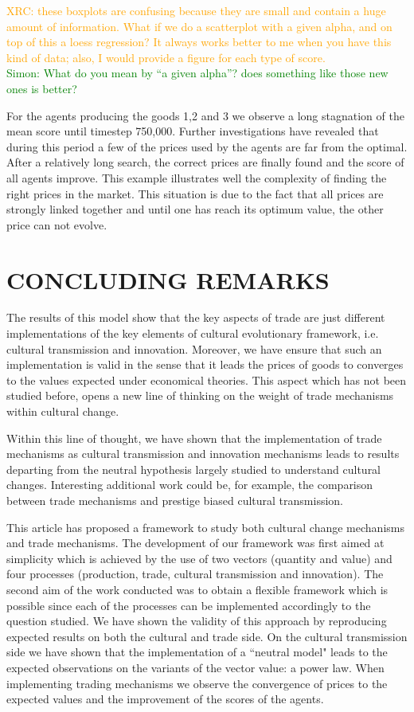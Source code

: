 \documentclass{wscpaperproc}
\newcommand{\memo}[2]{\textcolor{#1}{#2}}
\newcommand{\simon}[1]{\memo{green}{Simon: #1\\}}
\newcommand{\xrc}[1]{\memo{orange}{XRC: #1\\}}
\begin{document}
\xrc{these boxplots are confusing because they are small and contain a huge amount of information. What if we do a scatterplot with a given alpha, and on top of this a loess regression? It always works better to me when you have this kind of data; also, I would provide a figure for each type of score.}
\simon{What do you mean by ``a given alpha''? does something like those new ones is better?}

For the agents producing the goods 1,2 and 3 we observe a long stagnation of the mean score until timestep 750,000. Further investigations have revealed that during this period a few of the prices used by the agents are far from the optimal. After a relatively long search, the correct prices are finally found and the score of all agents improve. This example illustrates well the complexity of finding the right prices in the market. This situation is due to the fact that all prices are strongly linked together and until one has reach its optimum value, the other price can not evolve. 


\section{CONCLUDING REMARKS}

The results of this model show that the key aspects of trade are just different implementations of the key elements of cultural evolutionary framework, i.e. cultural transmission and innovation. Moreover, we have ensure that such an implementation is valid in the sense that it leads the prices of goods to converges to the values expected under economical theories. This aspect which has not been studied before, opens a new line of thinking on the weight of trade mechanisms within cultural change.

Within this line of thought, we have shown that the implementation of trade mechanisms as cultural transmission and innovation mechanisms leads to results departing from the neutral hypothesis largely studied to understand cultural changes. Interesting additional work could be, for example, the comparison between trade mechanisms and prestige biased cultural transmission.

This article has proposed a framework to study both cultural change mechanisms and trade mechanisms. The development of our framework was first aimed at simplicity which is achieved by the use of two vectors (quantity and value) and four processes (production, trade, cultural transmission and innovation). The second aim of the work conducted was to obtain a flexible framework which is possible since each of the processes can be implemented accordingly to the question studied. We have shown the validity of this approach by reproducing expected results on both the cultural and trade side. On the cultural transmission side we have shown that the implementation of a ``neutral model" leads to the expected observations on the variants of the vector value: a power law. When implementing trading mechanisms we observe the convergence of prices to the expected values and the improvement of the scores of the agents.
\end{document}
